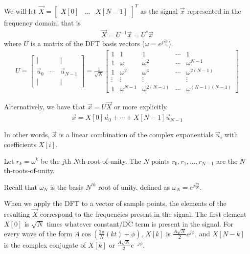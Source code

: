 We will let $\vec{X} = \begin{bmatrix} X[0] & \ldots & X[N-1] \end{bmatrix}^T$
as the signal $\vec{x}$ represented in the frequency domain, that is
\begin{align}
\vec{X} = U^{-1} \vec{x} = U^* \vec{x}
\end{align}
where $U$ is a matrix of the DFT basis vectors ($\omega =
e^{j\frac{2\pi}{n}}$).
\begin{align}
U =
\begin{bmatrix}
| & & | \\
\vec{u}_0 & \cdots & \vec{u}_{N-1} \\
| & & |
\end{bmatrix}
=
 \frac{1}{\sqrt{N}}
\begin{bmatrix}
1 & 1 & 1 & \cdots  & 1 \\
1 & \omega & \omega^2 & \cdots & \omega^{N-1} \\
1 & \omega^2 & \omega^4  & \cdots &  \omega^{2(N-1)}\\
\vdots & \vdots & \vdots & & \vdots \\
1 & \omega^{N-1} & \omega^{2(N-1)}  & \cdots  & \omega^{(N-1)(N-1)}
\end{bmatrix}
\end{align}

Alternatively, we have that $\vec{x} = U \vec{X}$ or more explicitly
\begin{align}
\vec{x} =  X[0] \vec{u}_0 + \cdots + X[N-1]\vec{u}_{N-1}
\end{align}

In other words, $\vec{x}$ is a linear combination of the complex exponentials $\vec{u}_i$ with coefficients $X[i]$.


Let $r_k = \omega^{k}$ be the $j$th $N$th-root-of-unity. The $N$ points
$r_{0}, r_{1}, \ldots, r_{N-1}$ are the $N$th-roots-of-unity.

Recall that $\omega_N$ is the basis $N^{th}$ root of unity, defined as $\omega_N = e^{j\frac{2\pi}{N}}$.

\vspace{0.5em}
When we apply the DFT to a vector of sample points, the elements of the resulting $\vec{X}$ correspond to the frequencies present in the signal. 
The first element $X[0]$ is $\sqrt{N}$ times whatever constant/DC term is present in the signal. 
For every wave of the form $A\cos(\frac{2\pi}{N}(kt) + \phi)$, $X[k]$ is $\frac{A \sqrt{N}}{2}e^{j\phi}$, and $X[N - k]$ is the complex conjugate of $X[k]$
or $\frac{A \sqrt{N}}{2}e^{-j\phi}$. 

